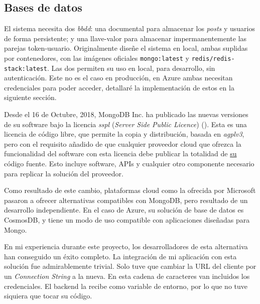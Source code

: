 \documentclass[11pt]{article}
\begin{document}
\begin{flushleft}
	\clearpage
	\subsection{Bases de datos}
	El sistema necesita dos \textit{\acrshort{bbdd}}: una documental para almacenar los \textit{posts} y usuarios de forma persistente; y una llave-valor para almacenar impermanentemente las parejas token-usuario. Originalmente diseñe el sistema en local, ambas suplidas por contenedores, con las imágenes oficiales \texttt{mongo:latest} y \texttt{redis/redis-stack:latest}. Las dos permiten su uso en local, para desarrollo, sin autenticación. Este no es el caso en producción, en Azure ambas necesitan credenciales para poder acceder, detallaré la implementación de estos en la siguiente sección.
	\linebreak
	
	Desde el 16 de Octubre, 2018, MongoDB Inc. ha publicado las nuevas versiones de su software bajo la licencia \textit{\acrshort{sspl}} (\textit{Server Side Public Licence}) (\cite{mongo_sspl}). Esta es una licencia de código libre, que permite la copia y distribución, basada en \textit{\acrshort{agpl}v3}, pero con el requisito añadido de que cualquier proveedor cloud que ofrezca la funcionalidad del software con esta licencia debe publicar la totalidad de \underline{su} código fuente. Esto incluye software, APIs y cualquier otro componente necesario para replicar la solución del proveedor. 
	\linebreak
	
	Como resultado de este cambio, plataformas cloud como la ofrecida por Microsoft pasaron a ofrecer alternativas compatibles con MongoDB, pero resultado de un desarrollo independiente. En el caso de Azure, su solución de base de datos es CosmosDB, y tiene un modo de uso compatible con aplicaciones diseñadas para Mongo. 
	\linebreak
	
	En mi experiencia durante este proyecto, los desarrolladores de esta alternativa han conseguido un éxito completo. La integración de mi aplicación con esta solución fue admirablemente trivial. Solo tuve que cambiar la URL del cliente por un \textit{Connection String} a la nueva. En esta cadena de caracteres van incluidos los credenciales. El backend la recibe como variable de entorno, por lo que no tuve siquiera que tocar su código.
	\linebreak
	

\end{flushleft}
\end{document}
